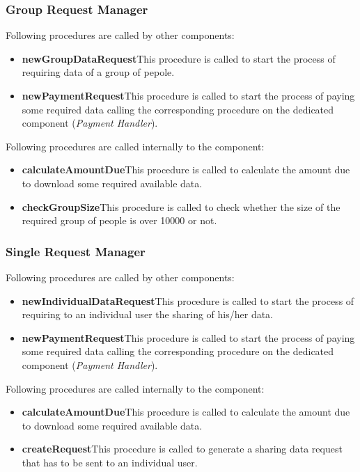 \subsubsection{Group Request Manager}
Following procedures are called by other components:
\begin{itemize}
  \item \textbf{newGroupDataRequest}\quad This procedure is called to start the process of requiring data of a group of pepole.
  \item \textbf{newPaymentRequest}\quad This procedure is called to start the process of paying some required data calling the corresponding procedure on the dedicated component (\textit{Payment Handler}).
\end{itemize}

\myparagraph{}
Following procedures are called internally to the component:
\begin{itemize}
  \item \textbf{calculateAmountDue}\quad This procedure is called to calculate the amount due to download some required available data.
  \item \textbf{checkGroupSize}\quad This procedure is called to check whether the size of the required group of people is over 10000 or not.
\end{itemize}

\subsubsection{Single Request Manager}
Following procedures are called by other components:
\begin{itemize}
  \item \textbf{newIndividualDataRequest}\quad This procedure is called to start the process of requiring to an individual user the sharing of his/her data.
  \item \textbf{newPaymentRequest}\quad This procedure is called to start the process of paying some required data calling the corresponding procedure on the dedicated component (\textit{Payment Handler}).
\end{itemize}

\myparagraph{}
Following procedures are called internally to the component:
\begin{itemize}
  \item \textbf{calculateAmountDue}\quad This procedure is called to calculate the amount due to download some required available data.
  \item \textbf{createRequest}\quad This procedure is called to generate a sharing data request that has to be sent to an individual user.
\end{itemize}

